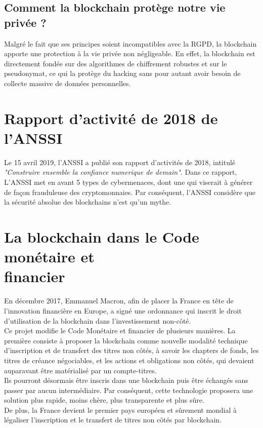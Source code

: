 \documentclass[12pt, a4paper, oneside]{book}
\begin{document}
    \subsection{Comment la blockchain protège notre vie privée ?}

    Malgré le fait que ses principes 
     soient incompatibles avec la RGPD, la blockchain apporte une protection à la vie privée non négligeable. 
     En effet, la blockchain est directement fondée sur des algorithmes de chiffrement robustes et sur le pseudonymat,
     ce qui la protège du hacking sans pour autant avoir besoin de collecte massive de données personnelles.
     \cite{reg}

    \section{Rapport d'activité de 2018 de l'ANSSI}

    Le 15 avril 2019, l'ANSSI a publié son rapport d'activités de 2018, intitulé \textit{"Construire ensemble la confiance 
    numerique de demain"}. 
    Dans ce rapport, L'ANSSI met en avant 5 types de cybermenaces, dont une qui viserait à générer de façon frauduleuse des 
    cryptomonnaies. Par conséquent, l'ANSSI considère que la sécurité absolue des blockchains n'est qu'un mythe.
    \cite{anssi2018}

    \section{La blockchain dans le Code monétaire et \\financier}

    En décembre 2017, Emmanuel Macron, afin de placer la France en tête de l'innovation financière en Europe, 
    a signé une ordonnance qui inscrit le droit d'utilisation de la blockchain dans l'investissement non-côté.
    \\
    \newline
    Ce projet modifie le Code Monétaire et financier de plusieurs manières. La première consiste à proposer la blockchain comme nouvelle 
    modalité technique d'inscription et de transfert des titres non côtés, à savoir les chapters de fonds, les titres de créance négociables,
    et les actions et obligations non côtés, qui devaient auparavant être matérialisé par un compte-titres.
    \\
    \newline
    Ils pourront désormais être inscris dans une blockchain puis être échangés sans passer par aucun intermédiaire.
    Par conséquent, cette technologie proposera une solution plus rapide, moins chère, plus transparente et plus sûre.
    \\
    \newline
    De plus, la France devient le premier pays européen et sûrement mondial à légaliser l'inscription et le transfert de titres non côtés par blockchain.
    \cite{CodeMonetaireFinancier}
 
\end{document}
